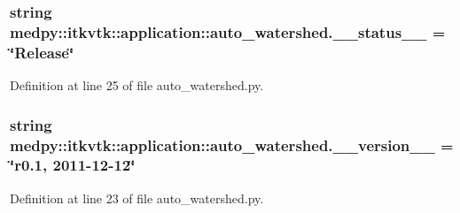 \hypertarget{namespacemedpy_1_1itkvtk_1_1application_1_1auto__watershed_aeab728ee24c394a2ae904e5ab8defeb2}{
\subsubsection[{\_\-\_\-status\_\-\_\-}]{\setlength{\rightskip}{0pt plus 5cm}string {\bf medpy::itkvtk::application::auto\_\-watershed.\_\-\_\-status\_\-\_\-} = \char`\"{}Release\char`\"{}}}
\label{namespacemedpy_1_1itkvtk_1_1application_1_1auto__watershed_aeab728ee24c394a2ae904e5ab8defeb2}


Definition at line 25 of file auto\_\-watershed.py.

\hypertarget{namespacemedpy_1_1itkvtk_1_1application_1_1auto__watershed_ac6e0ca8721a36b97a575c42d46f3a164}{
\subsubsection[{\_\-\_\-version\_\-\_\-}]{\setlength{\rightskip}{0pt plus 5cm}string {\bf medpy::itkvtk::application::auto\_\-watershed.\_\-\_\-version\_\-\_\-} = \char`\"{}r0.1, 2011-\/12-\/12\char`\"{}}}
\label{namespacemedpy_1_1itkvtk_1_1application_1_1auto__watershed_ac6e0ca8721a36b97a575c42d46f3a164}


Definition at line 23 of file auto\_\-watershed.py.

